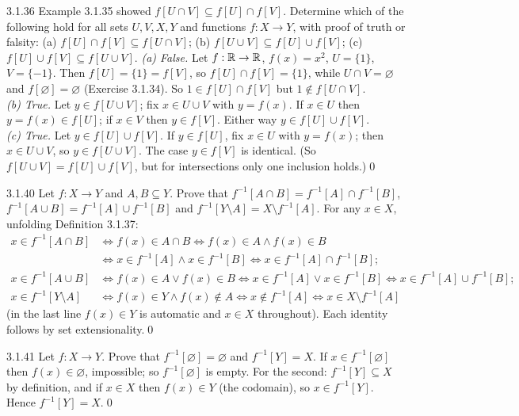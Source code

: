 \begin{bookex}[essential]{3.1.36}
Example 3.1.35 showed $f[U\cap V]\subseteq f[U]\cap f[V]$. Determine which of the following hold for all sets $U,V,X,Y$ and functions $f:X\to Y$, with proof of truth or falsity: (a) $f[U]\cap f[V]\subseteq f[U\cap V]$; (b) $f[U\cup V]\subseteq f[U]\cup f[V]$; (c) $f[U]\cup f[V]\subseteq f[U\cup V]$.
\solution
\emph{(a) False.} Let $f:\mathbb{R}\to\mathbb{R}$, $f(x)=x^2$, $U=\{1\}$, $V=\{-1\}$. Then $f[U]=\{1\}=f[V]$, so $f[U]\cap f[V]=\{1\}$, while $U\cap V=\varnothing$ and $f[\varnothing]=\varnothing$ (Exercise 3.1.34). So $1\in f[U]\cap f[V]$ but $1\notin f[U\cap V]$.\\
\emph{(b) True.} Let $y\in f[U\cup V]$; fix $x\in U\cup V$ with $y=f(x)$. If $x\in U$ then $y=f(x)\in f[U]$; if $x\in V$ then $y\in f[V]$. Either way $y\in f[U]\cup f[V]$.\\
\emph{(c) True.} Let $y\in f[U]\cup f[V]$. If $y\in f[U]$, fix $x\in U$ with $y=f(x)$; then $x\in U\cup V$, so $y\in f[U\cup V]$. The case $y\in f[V]$ is identical. (So $f[U\cup V]=f[U]\cup f[V]$, but for intersections only one inclusion holds.)\qed
\end{bookex}

\begin{bookex}[recommended]{3.1.40}
Let $f:X\to Y$ and $A,B\subseteq Y$. Prove that $f^{-1}[A\cap B]=f^{-1}[A]\cap f^{-1}[B]$, $f^{-1}[A\cup B]=f^{-1}[A]\cup f^{-1}[B]$ and $f^{-1}[Y\setminus A]=X\setminus f^{-1}[A]$.
\solution
For any $x\in X$, unfolding Definition 3.1.37:
\begin{align*}
x\in f^{-1}[A\cap B]&\Leftrightarrow f(x)\in A\cap B\Leftrightarrow f(x)\in A\wedge f(x)\in B\\
&\Leftrightarrow x\in f^{-1}[A]\wedge x\in f^{-1}[B]\Leftrightarrow x\in f^{-1}[A]\cap f^{-1}[B];\\
x\in f^{-1}[A\cup B]&\Leftrightarrow f(x)\in A\vee f(x)\in B\Leftrightarrow x\in f^{-1}[A]\vee x\in f^{-1}[B]\Leftrightarrow x\in f^{-1}[A]\cup f^{-1}[B];\\
x\in f^{-1}[Y\setminus A]&\Leftrightarrow f(x)\in Y\wedge f(x)\notin A\Leftrightarrow x\notin f^{-1}[A]\Leftrightarrow x\in X\setminus f^{-1}[A]
\end{align*}
(in the last line $f(x)\in Y$ is automatic and $x\in X$ throughout). Each identity follows by set extensionality.\qed
\end{bookex}

\begin{bookex}[recommended]{3.1.41}
Let $f:X\to Y$. Prove that $f^{-1}[\varnothing]=\varnothing$ and $f^{-1}[Y]=X$.
\solution
If $x\in f^{-1}[\varnothing]$ then $f(x)\in\varnothing$, impossible; so $f^{-1}[\varnothing]$ is empty. For the second: $f^{-1}[Y]\subseteq X$ by definition, and if $x\in X$ then $f(x)\in Y$ (the codomain), so $x\in f^{-1}[Y]$. Hence $f^{-1}[Y]=X$.\qed
\end{bookex}

